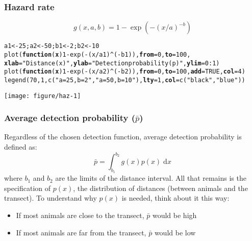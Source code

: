 \documentclass[color=usenames,dvipsnames]{beamer}\usepackage[]{graphicx}\usepackage[]{color}
\makeatletter
\newcommand{\hlnum}[1]{\textcolor[rgb]{0.69,0.494,0}{#1}}%
\newcommand{\hlstr}[1]{\textcolor[rgb]{0.749,0.012,0.012}{#1}}%
\newcommand{\hlopt}[1]{\textcolor[rgb]{0,0,0}{#1}}%
\newcommand{\hlstd}[1]{\textcolor[rgb]{0,0,0}{#1}}%
\newcommand{\hlkwa}[1]{\textcolor[rgb]{0,0,0}{\textbf{#1}}}%
\newcommand{\hlkwb}[1]{\textcolor[rgb]{0,0.341,0.682}{#1}}%
\newcommand{\hlkwc}[1]{\textcolor[rgb]{0,0,0}{\textbf{#1}}}%
\newcommand{\hlkwd}[1]{\textcolor[rgb]{0.004,0.004,0.506}{#1}}%
\newenvironment{kframe}{%
 \def\at@end@of@kframe{}%
 \ifinner\ifhmode%
  \def\at@end@of@kframe{\end{minipage}}%
  \begin{minipage}{\columnwidth}%
 \fi\fi%
 \def\FrameCommand##1{\hskip\@totalleftmargin \hskip-\fboxsep
 \colorbox{shadecolor}{##1}\hskip-\fboxsep
     \hskip-\linewidth \hskip-\@totalleftmargin \hskip\columnwidth}%
 \MakeFramed {\advance\hsize-\width
   \@totalleftmargin\z@ \linewidth\hsize
   \@setminipage}}%
 {\par\unskip\endMakeFramed%
 \at@end@of@kframe}
\newenvironment{knitrout}{}{} %
\makeatother
\begin{document}
\begin{frame}[fragile]
  \frametitle{Hazard rate}
  \footnotesize
  \[
    g(x,a,b) = 1-\exp(-(x/a)^{-b})
  \]
  \vspace{-12pt}
  \centering
\begin{knitrout}\scriptsize
{}\color{fgcolor}\begin{kframe}
\begin{alltt}
\hlstd{a1} \hlkwb{<-} \hlnum{25}\hlstd{; a2} \hlkwb{<-} \hlnum{50}\hlstd{; b1} \hlkwb{<-} \hlnum{2}\hlstd{; b2} \hlkwb{<-} \hlnum{10}
\hlkwd{plot}\hlstd{(}\hlkwa{function}\hlstd{(}\hlkwc{x}\hlstd{)} \hlnum{1}\hlopt{-}\hlkwd{exp}\hlstd{(}\hlopt{-}\hlstd{(x}\hlopt{/}\hlstd{a1)}\hlopt{^}\hlstd{(}\hlopt{-}\hlstd{b1)),} \hlkwc{from}\hlstd{=}\hlnum{0}\hlstd{,} \hlkwc{to}\hlstd{=}\hlnum{100}\hlstd{,}
     \hlkwc{xlab}\hlstd{=}\hlstr{"Distance (x)"}\hlstd{,} \hlkwc{ylab}\hlstd{=}\hlstr{"Detection probability (p)"}\hlstd{,} \hlkwc{ylim}\hlstd{=}\hlnum{0}\hlopt{:}\hlnum{1}\hlstd{)}
\hlkwd{plot}\hlstd{(}\hlkwa{function}\hlstd{(}\hlkwc{x}\hlstd{)} \hlnum{1}\hlopt{-}\hlkwd{exp}\hlstd{(}\hlopt{-}\hlstd{(x}\hlopt{/}\hlstd{a2)}\hlopt{^}\hlstd{(}\hlopt{-}\hlstd{b2)),} \hlkwc{from}\hlstd{=}\hlnum{0}\hlstd{,} \hlkwc{to}\hlstd{=}\hlnum{100}\hlstd{,} \hlkwc{add}\hlstd{=}\hlnum{TRUE}\hlstd{,} \hlkwc{col}\hlstd{=}\hlnum{4}\hlstd{)}
\hlkwd{legend}\hlstd{(}\hlnum{70}\hlstd{,} \hlnum{1}\hlstd{,} \hlkwd{c}\hlstd{(}\hlstr{"a=25, b=2"}\hlstd{,} \hlstr{"a=50, b=10"}\hlstd{),} \hlkwc{lty}\hlstd{=}\hlnum{1}\hlstd{,} \hlkwc{col}\hlstd{=}\hlkwd{c}\hlstd{(}\hlstr{"black"}\hlstd{,}\hlstr{"blue"}\hlstd{))}
\end{alltt}
\end{kframe}
\texttt{[image: figure/haz-1]} 

\end{knitrout}
\end{frame}



\begin{frame}
  \frametitle{Average detection probability ($\bar{p}$)}
  Regardless of the chosen detection function, average detection
  probability is defined as: 
  \[
     \bar{p} = \int_{b_1}^{b_2} g(x)p(x) \; \mathrm{d}x
   \]
   where $b_1$ and $b_2$ are the limits of the distance interval.
  \pause
  \vfill
  All that remains is the specification of $p(x)$, the
  distribution of distances (between animals and the transect).
  \pause
  \vfill
  To understand why $p(x)$ is needed, think about it this way:
  \begin{itemize}
    \item If most animals are close to the transect, $\bar{p}$ would
      be high
    \item If most animals are far from the transect, $\bar{p}$ would
      be low
  \end{itemize}
\end{frame}
\end{document}
